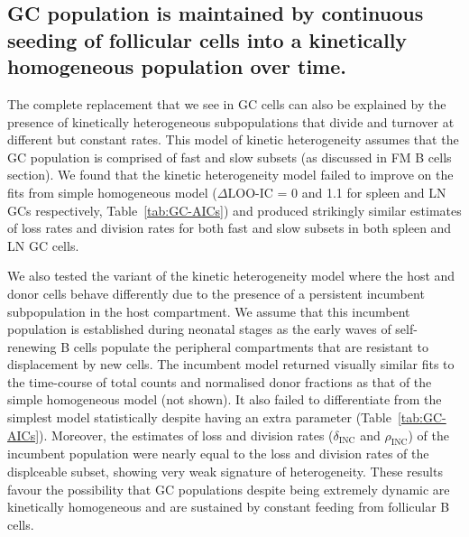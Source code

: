 \documentclass[11pt,onecolumn]{article}
\newcommand{\red}[1]{{\color{red}{#1}}}
\newcommand{\looic}{\ensuremath{\Delta \text{LOO-IC}}}
\begin{document}
{\subsection*{GC population is maintained by continuous seeding of follicular cells into a kinetically homogeneous population over time.}
The complete replacement that we see in GC cells can also be explained by the presence of kinetically heterogeneous subpopulations that divide and turnover at different but constant rates. 
This model of kinetic heterogeneity assumes that the GC population is comprised of fast and slow subsets (as discussed in FM B cells section).
We found that the kinetic heterogeneity model failed to improve on the fits from simple homogeneous model ({\looic} = 0 and 1.1 for spleen and LN GCs respectively, Table~\ref{tab:GC-AICs}) and produced  strikingly similar estimates of loss rates and division rates for both fast and slow subsets in both spleen and LN GC cells.

We also tested the variant of the kinetic heterogeneity model where the host and donor cells behave differently due to the presence of a persistent incumbent subpopulation in the host compartment.
We assume that this incumbent population is established during neonatal stages as the early waves of self-renewing B cells populate the peripheral compartments that are resistant to displacement by new cells.
The incumbent model returned visually similar fits to the time-course of total counts and normalised donor fractions as that of the simple homogeneous model (not shown).
It also failed to differentiate from the simplest model statistically despite having an extra parameter (Table~\ref{tab:GC-AICs}).
Moreover, the estimates of loss and division rates ($\delta_{\text{INC}}$ and $\rho_{\text{INC}}$) of the incumbent population were nearly equal to the loss and division rates of the displceable subset, showing very weak signature of heterogeneity.
These results favour the possibility that GC populations despite being extremely dynamic are kinetically homogeneous and are sustained by constant feeding from follicular B cells.


}
\end{document}
